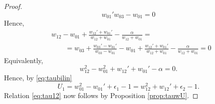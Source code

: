 \documentclass{amsart}
\theoremstyle{definition}
\begin{document}
\begin{proof}
\[{      w_{01}'}{w_{03}-w_{01}} =0\]
  Hence,
  \begin{align*}
    &w_{12} - w_{01}  + \frac{w_{12}' + w_{01}'}{w_{12} + w_{01}} -
    \frac{\alpha}{w_{12} + w_{01} } =\\
    &\qquad = w_{03}+ \frac{w_{03}' -
    w_{01}'}{w_{03}-w_{01}}-w_{01} + \frac{w_{12}' + w_{01}'}{w_{12} + w_{01}}
    - \frac{\alpha}{w_{12} + w_{01} }    = 0
  \end{align*}
  Equivalently,
  \begin{equation}
    \label{eq:w13w01}
    w_{12}^2 - w_{01}^2 + w_{12}' + w_{01}' - \alpha = 0.
  \end{equation}
  Hence, by  \eqref{eq:taubilin} 
  \[ U_1= w_{01}^2 - w_{01}' + \epsilon_1-1  = w_{12}^2 + w_{12}' + \epsilon_2-1.\]
  Relation \eqref{eq:tau12} now follows by Proposition  \ref{prop:tauwU}.  
\end{proof}
\end{document}
